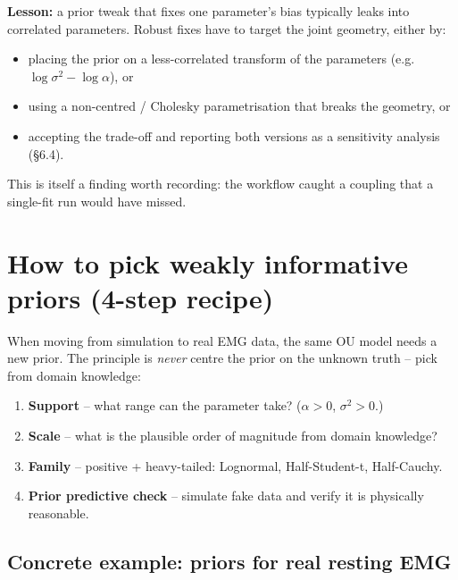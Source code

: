 \documentclass[11pt,a4paper]{article}
\begin{document}
\textbf{Lesson:} a prior tweak that fixes one parameter's bias
typically leaks into correlated parameters. Robust fixes have to
target the joint geometry, either by:

\begin{itemize}\setlength{\itemsep}{0pt}
    \item placing the prior on a less-correlated transform of the
          parameters (e.g.\ $\log\sigma^2 - \log\alpha$), or
    \item using a non-centred / Cholesky parametrisation that
          breaks the geometry, or
    \item accepting the trade-off and reporting both versions as
          a sensitivity analysis (\S 6.4).
\end{itemize}

\noindent This is itself a finding worth recording: the workflow
caught a coupling that a single-fit run would have missed.

\section*{How to pick weakly informative priors (4-step recipe)}

When moving from simulation to real EMG data, the same OU model
needs a new prior. The principle is \emph{never} centre the prior
on the unknown truth -- pick from domain knowledge:

\begin{enumerate}\setlength{\itemsep}{0pt}
    \item \textbf{Support} -- what range can the parameter take?
          ($\alpha > 0$, $\sigma^2 > 0$.)
    \item \textbf{Scale} -- what is the plausible order of
          magnitude from domain knowledge?
    \item \textbf{Family} -- positive + heavy-tailed: Lognormal,
          Half-Student-t, Half-Cauchy.
    \item \textbf{Prior predictive check} -- simulate fake data
          and verify it is physically reasonable.
\end{enumerate}

\subsection*{Concrete example: priors for real resting EMG}
\end{document}
